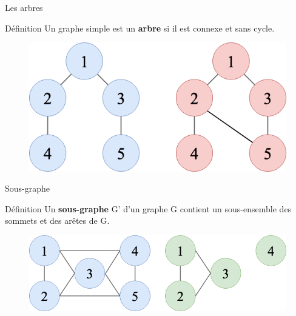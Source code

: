 \documentclass[10pt,xcolor=dvipsnames]{beamer}
\newcommand{\defin}[1]{\textcolor{darkspringgreen}{#1}}
\begin{document}
\begin{frame}{Les arbres}
    \begin{exampleblock}{Définition}
        Un graphe simple est un \defin{\textbf{arbre}} si il est \defin{connexe} et sans \defin{cycle}.
    \end{exampleblock}
    
    \begin{figure}
        \centering
        \includegraphics[scale=0.4]{figures/CM3/tree.png}
        \label{fig:my_label}
    \end{figure}
\end{frame}

\begin{frame}{Sous-graphe}
    \begin{exampleblock}{Définition}
        Un \defin{\textbf{sous-graphe}} G' d'un graphe G contient un sous-ensemble des sommets et des arêtes de G.
    \end{exampleblock}
    
    \begin{figure}
        \centering
        \includegraphics[scale=0.4]{figures/CM3/subgraph.png}
        \label{fig:my_label}
    \end{figure}
\end{frame}
\end{document}
